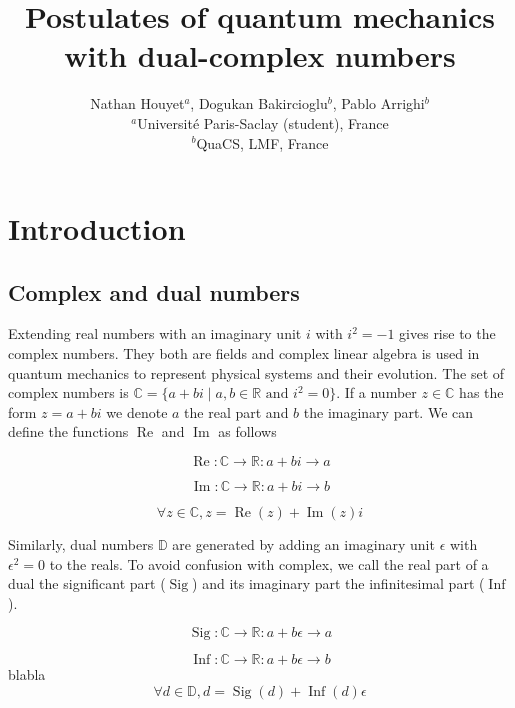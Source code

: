 \documentclass{article}
\title{Postulates of quantum mechanics with dual-complex numbers}
\author{Nathan Houyet$^{a}$, Dogukan Bakircioglu$^{b}$, Pablo Arrighi$^{b}$ \\
        \small $^{a}$Université Paris-Saclay (student), France \\
        \small $^{b}$QuaCS, LMF, France \\
}
\date{}
\newcommand{\R}{\mathbb{R}}
\newcommand{\C}{\mathbb{C}}
\newcommand{\D}{\mathbb{D}}
\newcommand{\e}{\epsilon}
\renewcommand{\Re}{\operatorname{Re}}
\renewcommand{\Im}{\operatorname{Im}}
\newcommand{\Sig}{\operatorname{Sig}}
\newcommand{\Inf}{\operatorname{Inf}}
\begin{document}
\maketitle

\section{Introduction}
\subsection{Complex and dual numbers}
\noindent Extending real numbers with an imaginary unit $i$ with $i^2 = -1$ gives rise to the complex numbers. They both are fields and complex linear algebra is used in quantum mechanics to represent physical systems and their evolution. The set of complex numbers is $\C = \{a + bi \; | \; a, b \in \R \text{ and } i^2 = 0\}$. If a number $z \in \C$ has the form $z = a + bi$ we denote $a$ the real part and $b$ the imaginary part. We can define the functions $\Re$ and $\Im$ as follows
\begin{multicols}{3}
\noindent
\begin{equation}
\Re: \C \to \R: a + bi \to a
\end{equation}

\columnbreak
\noindent
\begin{equation}
\Im: \C \to \R: a + bi \to b
\end{equation}

\columnbreak
\noindent
\begin{equation}
\forall z \in \C, z = \Re(z) + \Im(z)i
\end{equation}

\end{multicols}

Similarly, dual numbers $\D$ are generated by adding an imaginary unit $\e$ with $\e^2 = 0$ to the reals. To avoid confusion with complex, we call the real part of a dual the significant part ($\Sig$) and its imaginary part the infinitesimal part ($\Inf$).

\begin{multicols}{3}
\noindent
\begin{equation}
\Sig: \C \to \R: a + b\e \to a
\end{equation}

\columnbreak
\noindent
\begin{equation}
\Inf: \C \to \R: a + b\e \to b
\end{equation}
blabla
\columnbreak
\noindent
\begin{equation}
\forall d \in \D, d = \Sig(d) + \Inf(d)\e
\end{equation}

\end{multicols}
\end{document}
